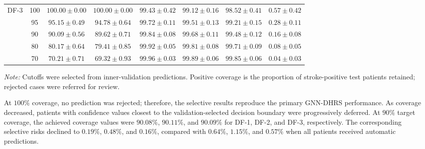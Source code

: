 \documentclass[pdflatex,sn-mathphys-num]{sn-jnl}%
\theoremstyle{thmstyleone}%
\theoremstyle{thmstyletwo}%
\theoremstyle{thmstylethree}%
\begin{document}
\begin{table}[!ht]
{\begin{tabular}{@{}lccccccc@{}}
\multirow{5}{*}{DF-3}
& 100 & $100.00\pm0.00$ & $100.00\pm0.00$
& $99.43\pm0.42$ & $99.12\pm0.16$ & $98.52\pm0.41$
& $0.57\pm0.42$ \\
& 95 & $95.15\pm0.49$ & $94.78\pm0.64$
& $99.72\pm0.11$ & $99.51\pm0.13$ & $99.21\pm0.15$
& $0.28\pm0.11$ \\
& 90 & $90.09\pm0.56$ & $89.62\pm0.71$
& $99.84\pm0.08$ & $99.68\pm0.11$ & $99.48\pm0.12$
& $0.16\pm0.08$ \\
& 80 & $80.17\pm0.64$ & $79.41\pm0.85$
& $99.92\pm0.05$ & $99.81\pm0.08$ & $99.71\pm0.09$
& $0.08\pm0.05$ \\
& 70 & $70.21\pm0.71$ & $69.32\pm0.93$
& $99.96\pm0.03$ & $99.89\pm0.06$ & $99.85\pm0.06$
& $0.04\pm0.03$ \\
\bottomrule
\end{tabular}%
}

\vspace{2pt}
\begin{minipage}{0.98\textwidth}
\footnotesize
\textit{Note:} Cutoffs were selected from inner-validation predictions.
Positive coverage is the proportion of stroke-positive test patients retained;
rejected cases were referred for review.
\end{minipage}
\end{table}
\endgroup

 {
At \(100\%\) coverage, no prediction was rejected; therefore, the selective
results reproduce the primary GNN-DHRS performance. As coverage decreased,
patients with confidence values closest to the validation-selected decision
boundary were progressively deferred. At \(90\%\) target coverage, the
achieved coverage values were \(90.08\%\), \(90.11\%\), and \(90.09\%\) for
DF-1, DF-2, and DF-3, respectively. The corresponding selective risks declined
to \(0.19\%\), \(0.48\%\), and \(0.16\%\), compared with \(0.64\%\),
\(1.15\%\), and \(0.57\%\) when all patients received automatic predictions.
}

\begingroup
 
\end{document}

